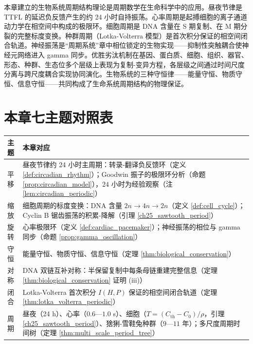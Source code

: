 \begin{remark}[与全书的衔接]
本章建立的生物系统周期结构理论是周期数学在生命科学中的应用。昼夜节律是 TTFL 的延迟负反馈产生的约 24 小时自持振荡。心率周期是起搏细胞的离子通道动力学在相空间中构成的极限环。细胞周期是 DNA 含量在 S 期复制、在 M 期分裂的完整标度变换。种群周期（Lotka-Volterra 模型）是首次积分保证的相空间闭合轨道。神经振荡是“周期系统”章中相位锁定的生物实现——抑制性突触耦合使神经元网络进入 gamma 同步。优胜劣汰机制在基因、蛋白质、细胞、组织、器官、形态、种群、生态位多个层级上表现为复制-变异方程，各层级之间通过时间尺度分离与跨尺度耦合实现协同演化。生物系统的三种守恒律——能量守恒、物质守恒、信息守恒——共同构成了生命系统周期结构的物理保证。
\end{remark}

\section*{本章七主题对照表}

\begin{center}
\begin{tabular}{>{\centering\arraybackslash}p{2.2cm}>{\centering\arraybackslash}p{10.5cm}}
\toprule
主题 & 本章对应 \\
\midrule
平移 & 昼夜节律约 24 小时主周期：转录-翻译负反馈环（定义 \ref{def:circadian_rhythm}）；Goodwin 振子的极限环分析（命题 \ref{prop:circadian_model}），$24$ 小时为经验观察（注 \ref{lem:circadian_periodic}） \\
缩放 & 细胞周期的标度变换：DNA 含量 $2n \to 4n \to 2n$（定义 \ref{def:cell_cycle}）；Cyclin B 锯齿振荡的积累-降解（引理 \ref{ch25_sawtooth_period}） \\
旋转 & 心率极限环（定义 \ref{def:cardiac_pacemaker}）；神经振荡的相位与 gamma 同步（命题 \ref{prop:gamma_oscillation}） \\
守恒 & 能量守恒、物质守恒、信息守恒（定理 \ref{thm:biological_conservation}） \\
对称 & DNA 双链互补对称：半保留复制中每条母链重建完整信息（定理 \ref{thm:biological_conservation} 证明 (iii)） \\
闭合 & Lotka-Volterra 首次积分 $I(H,P)$ 保证的相空间闭合轨道（定理 \ref{thm:lotka_volterra_periodic}） \\
周期 & 昼夜（24 h）、心率（$0.6$—$1.0$ s）、细胞（$T=(C_{\text{th}}-C_0)/\rho$，引理 \ref{ch25_sawtooth_period}）、猞猁-雪鞋兔种群（$9$—$11$ 年）；多尺度周期时间树（定理 \ref{thm:multi_scale_period_tree}） \\
\bottomrule
\end{tabular}
\end{center}

